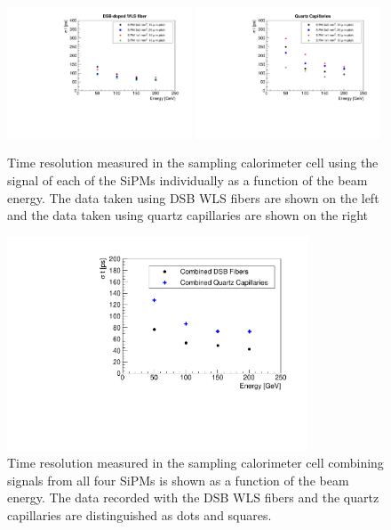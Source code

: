 \begin{figure}[!htb]
\centering
\includegraphics[width=0.49\textwidth]{figures/ShashlikTimeResolutionVsEnergy_DSB.pdf}
\includegraphics[width=0.49\textwidth]{figures/ShashlikTimeResolutionVsEnergy_Capillaries.pdf}
\caption{\label{TimeResolutionVsEnergy} Time resolution measured in the sampling calorimeter 
cell using the signal of each of the SiPMs individually as a function of the beam energy. 
The data taken using DSB WLS fibers are shown on
the left and the data taken using quartz capillaries are shown on the right}
\end{figure}



\begin{figure}[!htb]
\centering
\includegraphics[width=0.8\textwidth]{figures/ShashlikTimeResolutionCombinedChannelVsEnergy.pdf}
\caption{\label{TimeResolutionCombined}  Time resolution measured in the sampling calorimeter cell combining signals from all four  
SiPMs is shown as a function of the beam energy.  The data recorded with the DSB WLS fibers and the
quartz capillaries are distinguished as dots and squares.}
\end{figure}



